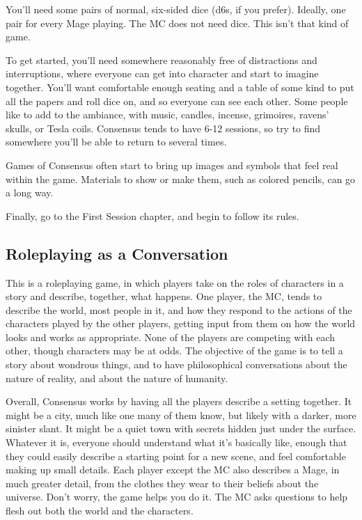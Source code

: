 \documentclass[
]{article}
\begin{document}
You'll need some pairs of normal, six-sided dice (d6s, if you prefer).
Ideally, one pair for every Mage playing. The MC does not need dice.
This isn't that kind of game.

To get started, you'll need somewhere reasonably free of distractions
and interruptions, where everyone can get into character and start to
imagine together. You'll want comfortable enough seating and a table of
some kind to put all the papers and roll dice on, and so everyone can
see each other. Some people like to add to the ambiance, with music,
candles, incense, grimoires, ravens' skulls, or Tesla coils. Consensus
tends to have 6-12 sessions, so try to find somewhere you'll be able to
return to several times.

Games of Consensus often start to bring up images and symbols that feel
real within the game. Materials to show or make them, such as colored
pencils, can go a long way.

Finally, go to the First Session chapter, and begin to follow its rules.

\hypertarget{roleplaying-as-a-conversation}{%
\subsection{Roleplaying as a
Conversation}\label{roleplaying-as-a-conversation}}

This is a roleplaying game, in which players take on the roles of
characters in a story and describe, together, what happens. One player,
the MC, tends to describe the world, most people in it, and how they
respond to the actions of the characters played by the other players,
getting input from them on how the world looks and works as appropriate.
None of the players are competing with each other, though characters may
be at odds. The objective of the game is to tell a story about wondrous
things, and to have philosophical conversations about the nature of
reality, and about the nature of humanity.

Overall, Consensus works by having all the players describe a setting
together. It might be a city, much like one many of them know, but
likely with a darker, more sinister slant. It might be a quiet town with
secrets hidden just under the surface. Whatever it is, everyone should
understand what it's basically like, enough that they could easily
describe a starting point for a new scene, and feel comfortable making
up small details. Each player except the MC also describes a Mage, in
much greater detail, from the clothes they wear to their beliefs about
the universe. Don't worry, the game helps you do it. The MC asks
questions to help flesh out both the world and the characters.
\end{document}
